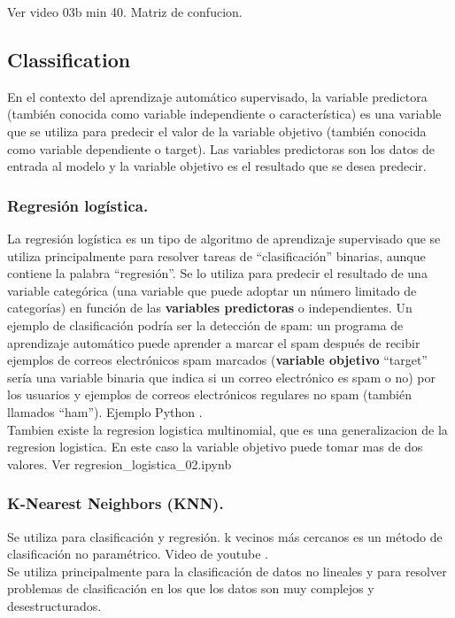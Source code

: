 \documentclass[../main.tex]{subfiles}
\begin{document}
        Ver video 03b min 40. Matriz de confucion.

    \subsection{Classification}
        En el contexto del aprendizaje automático supervisado, la variable predictora (también conocida como variable independiente o característica) es una variable que se utiliza para predecir el valor de la variable objetivo (también conocida como variable dependiente o target). Las variables predictoras son los datos de entrada al modelo y la variable objetivo es el resultado que se desea predecir.
        
        \subsubsection{Regresión logística.}
            La regresión logística es un tipo de algoritmo de aprendizaje supervisado que se utiliza principalmente para resolver tareas de “clasificación” binarias, aunque contiene la palabra “regresión”. Se lo utiliza para predecir el resultado de una variable categórica (una variable que puede adoptar un número limitado de categorías) en función de las \textbf{variables predictoras} o independientes. Un ejemplo de clasificación podría ser la detección de spam: un programa de aprendizaje automático puede aprender a marcar el spam después de recibir ejemplos de correos electrónicos spam marcados (\textbf{variable objetivo} “target” sería una variable binaria que indica si un correo electrónico es spam o no) por los usuarios y ejemplos de correos electrónicos regulares no spam (también llamados “ham”).  Ejemplo Python \cite{regresión_logística_colab}. \\

            Tambien existe la regresion logistica multinomial, que es una generalizacion de la regresion logistica. En este caso la variable objetivo puede tomar mas de dos valores. Ver regresion\_logistica\_02.ipynb

        \subsubsection{K-Nearest Neighbors (KNN).}
            Se utiliza para clasificación y regresión.
            k vecinos más cercanos es un método de clasificación no paramétrico. Video de youtube \cite{knn_you_tube}.\\
            Se utiliza principalmente para la clasificación de datos no lineales y para resolver problemas de clasificación en los que los datos son muy complejos y desestructurados.\\
            
\end{document}
